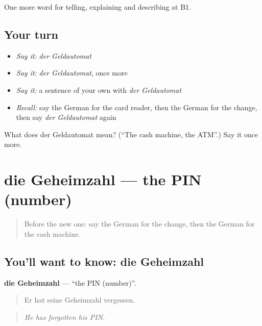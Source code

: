 \begin{grammarlens}[title={What you've built}]
One more word for telling, explaining and describing at B1.
\end{grammarlens}

\subsection*{Your turn}
\begin{itemize}
\raggedright
  \item \emph{Say it:} \emph{der Geldautomat}
  \item \emph{Say it:} \emph{der Geldautomat}, once more
  \item \emph{Say it:} a sentence of your own with \emph{der Geldautomat}
  \item \emph{Recall:} say the German for the card reader, then the German for the change, then say \emph{der Geldautomat} again
\end{itemize}

\begin{tcolorbox}[breakable,colback=teal!4,colframe=teal!35!black,title={Before you move on}]
What does der Geldautomat mean? (\textquotedblleft{}The cash machine, the ATM\textquotedblright{}.) Say it once more.
\end{tcolorbox}
\section[die Geheimzahl]{die Geheimzahl — the PIN (number)}

\label{lesson:GE-C450-geheimzahl}



\begin{quote}
Before the new one: say the German for the change, then the German for the cash machine.
\end{quote}

\subsection*{You'll want to know: die Geheimzahl}
\textbf{die Geheimzahl} — \textquotedblleft{}the PIN (number)\textquotedblright{}.

\begin{quote}
Er hat seine Geheimzahl vergessen.
\end{quote}

\begin{quote}
\emph{He has forgotten his PIN.}
\end{quote}

